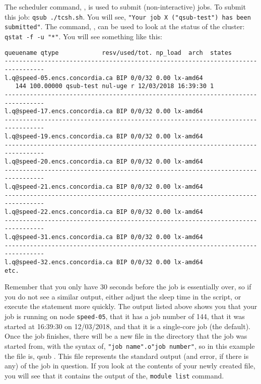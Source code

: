 \documentclass{easychair}
\begin{document}
The scheduler command, , is used to submit (non-interactive) jobs. To submit this job: \texttt{qsub ./tcsh.sh}. You will see, \texttt{"Your job X ("qsub-test") has been submitted"}. The command, , can be used to look at the status of the cluster: \texttt{qstat -f -u "*"}. You will see something like this: 

\small
\begin{verbatim}
queuename qtype            resv/used/tot. np_load  arch  states
--------------------------------------------------------------------------------- 
l.q@speed-05.encs.concordia.ca BIP 0/0/32 0.00 lx-amd64
   144 100.00000 qsub-test nul-uge r 12/03/2018 16:39:30 1 
--------------------------------------------------------------------------------- 
l.q@speed-17.encs.concordia.ca BIP 0/0/32 0.00 lx-amd64  
--------------------------------------------------------------------------------- 
l.q@speed-19.encs.concordia.ca BIP 0/0/32 0.00 lx-amd64  
--------------------------------------------------------------------------------- 
l.q@speed-20.encs.concordia.ca BIP 0/0/32 0.00 lx-amd64  
--------------------------------------------------------------------------------- 
l.q@speed-21.encs.concordia.ca BIP 0/0/32 0.00 lx-amd64  
--------------------------------------------------------------------------------- 
l.q@speed-22.encs.concordia.ca BIP 0/0/32 0.00 lx-amd64  
--------------------------------------------------------------------------------- 
l.q@speed-31.encs.concordia.ca BIP 0/0/32 0.00 lx-amd64  
--------------------------------------------------------------------------------- 
l.q@speed-32.encs.concordia.ca BIP 0/0/32 0.00 lx-amd64  
etc.
\end{verbatim}
\normalsize

Remember that you only have 30 seconds before the job is essentially over, so if you do not see a similar output, either adjust the sleep time in the script, or execute the  statement more quickly. The  output listed above shows you that your job is 
running on node \texttt{speed-05}, that it has a job number of 144, that it was started at 16:39:30 on 12/03/2018, and that it is a single-core job (the default). 
Once the job finishes, there will be a new file in the directory that the job was started from, with the syntax of, \texttt{"job name".o"job number"}, so in this example the file is, qsub . This file represents the standard output (and error, if there is any) of the job in question. If you look at the contents of your newly created file, you will see that it contains the output of the, \texttt{module list} command. 
\end{document}
